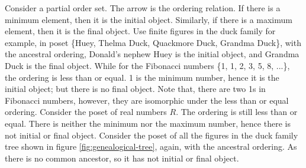 \documentclass{article}
\begin{document}
\begin{example}
\normalfont
Consider a partial order set. The arrow is the ordering relation. If there is a minimum element, then it is the initial object. Similarly, if there is a maximum element, then it is the final object. Use finite figures in the duck family for example, in poset \{Huey, Thelma Duck, Quackmore Duck, Grandma Duck\}, with the ancestral ordering, Donald's nephew Huey is the initial object, and Grandma Duck is the final object. While for the Fibonacci numbers \{1, 1, 2, 3, 5, 8, ...\}, the ordering is less than or equal. 1 is the minimum number, hence it is the initial object; but there is no final object. Note that, there are two 1s in Fibonacci numbers, however, they are isomorphic under the less than or equal ordering. Consider the poset of real numbers $R$. The ordering is still less than or equal. There is neither the minimum nor the maximum number, hence there is not initial or final object. Consider the poset of all the figures in the duck family tree shown in figure \ref{fig:genealogical-tree}, again, with the ancestral ordering. As there is no common ancestor, so it has not initial or final object.
\end{example}
\end{document}
